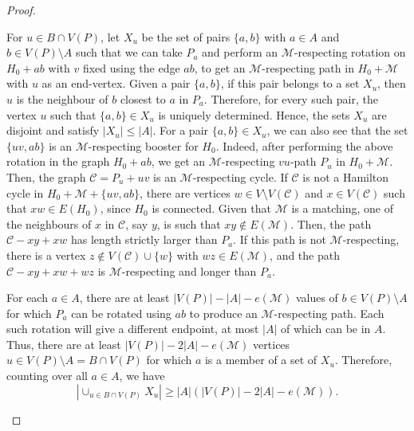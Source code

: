 \documentclass[10pt,a4paper,reqno]{amsart}
\begin{document}
\begin{proof}
\begin{claimproof}
For $u \in B \cap V(P)$, let $X_u$ be the set of pairs $\{a, b\}$ with $a \in A$ and $b \in V(P) \setminus A$ such that we can take $P_a$ and perform an $\mathcal{M}$-respecting rotation on $H_0 + ab$ with $v$ fixed using the edge $ab$, to get an $\mathcal{M}$-respecting path in $H_0 + \mathcal{M}$ with $u$ as an end-vertex. Given a pair $\{a, b\}$, if this pair belongs to a set $X_u$, then $u$ is the neighbour of $b$ closest to $a$ in $P_a$. Therefore, for every such pair, the vertex $u$ such that $\{a, b\} \in X_u$ is uniquely determined. Hence, the sets $X_u$ are disjoint and satisfy $|X_u|\le |A|$. For a pair $\{a, b\} \in X_u$, we can also see that the set $\{uv, ab\}$ is an $\mathcal{M}$-respecting booster for $H_0$. Indeed, after performing the above rotation in the graph $H_0 + ab$, we get an $\mathcal{M}$-respecting $vu$-path $P_u$ in $H_0 + \mathcal{M}$. Then, the graph $\mathcal{C} = P_u + uv$ is an $\mathcal{M}$-respecting cycle. If $\mathcal{C}$ is not a Hamilton cycle in $H_0 + \mathcal{M} + \{uv, ab\}$, there are vertices $w \in V \setminus V(\mathcal{C})$ and $x\in V(\mathcal{C})$ such that $xw\in E(H_0)$, since $H_0$ is connected. Given that $\mathcal{M}$ is a matching, one of the neighbours of $x$ in $\mathcal{C}$, say $y$, is such that $xy \not\in E(\mathcal{M})$. Then, the path $\mathcal{C} - xy + xw$ has length strictly larger than $P_a$. If this path is not $\mathcal{M}$-respecting, there is a vertex $z \not\in V(\mathcal{C}) \cup \{w\}$ with $wz \in E(\mathcal{M})$, and the path $\mathcal{C} - xy + xw + wz$ is $\mathcal{M}$-respecting and longer than $P_a$.

For each $a \in A$, there are at least $|V(P)| - |A| - e(\mathcal{M})$ values of $b \in V(P) \setminus A$ for which $P_a$ can be rotated using $ab$ to produce an $\mathcal{M}$-respecting path. Each such rotation will give a different endpoint, at most $|A|$ of which can be in $A$. Thus, there are at least $|V(P)| - 2|A| - e(\mathcal{M})$ vertices $u \in V(P) \setminus A = B \cap V(P)$ for which $a$ is a member of a set of $X_u$. Therefore, counting over all $a \in A$, we have 
\[
\left|\cup_{u \in B \cap V(P)} X_u\right| \geq |A|\left( |V(P)| - 2|A| - e(\mathcal{M}) \right).
\]
    

\end{claimproof}
\end{proof}
\end{document}
